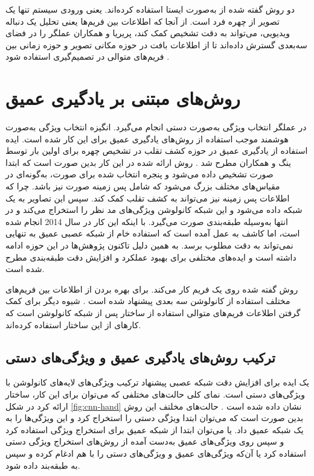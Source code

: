 دو روش گفته شده از  به‌صورت ایستا استفاده کرده‌اند. یعنی ورودی سیستم تنها یک تصویر از چهره فرد است. از آنجا که اطلاعات بین فریم‌ها یعنی تحلیل یک دنباله ویدیویی، می‌تواند به دقت تشخیص کمک کند، پریریا و همکاران عملگر  را در فضای سه‌بعدی گسترش داده‌اند تا از اطلاعات بافت در حوزه مکانی تصویر و حوزه زمانی بین فریم‌های متوالی در تصمیم‌گیری استفاده شود
\cite{freitas2012lbp}.
\section{روش‌های مبتنی بر یادگیری عمیق}
 در عملگر  انتخاب ویژگی به‌صورت دستی انجام می‌گیرد. انگیزه انتخاب ویژگی به‌صورت هوشمند موجب استفاده از روش‌های یادگیری عمیق برای این کار شده است. ایده استفاده از یادگیری عمیق در حوزه کشف تقلب در تشخیص چهره برای اولین بار توسط ینگ و همکاران مطرح شد 
\cite{yang2014learn}.
 روش ارائه شده در این کار بدین صورت است که ابتدا صورت تشخیص داده می‌شود و پنجره انتخاب شده برای صورت، به‌گونه‌ای در مقیاس‌های مختلف بزرگ می‌شود که شامل پس زمینه صورت نیز باشد. چرا که اطلاعات پس زمینه نیز می‌تواند به کشف تقلب کمک کند. سپس این تصاویر به یک شبکه 
\cite{krizhevsky2012imagenet}
  داده می‌شود و این شبکه کانولوشن ویژگی‌های مد نظر را استخراج می‌کند و در انتها به‌وسیله  طبقه‌بندی صورت می‌گیرد. با اینکه این کار در سال 2014 انجام شده است، اما کاشف به عمل آمده است که استفاده خام از شبکه عصبی عمیق به تنهایی نمی‌تواند به دقت مطلوب برسد. به همین دلیل تاکنون پژوهش‌ها در این حوزه ادامه داشته است و ایده‌های مختلفی برای بهبود عملکرد و افزایش دقت طبقه‌بندی مطرح شده است. 
 
 روش گفته شده روی یک فریم کار می‌کند. برای بهره بردن از اطلاعات بین فریم‌های مختلف استفاده از کانولوشن سه بعدی پیشنهاد شده است 
\cite{gan20173d,li2018learning}
 . شیوه دیگر برای کمک گرفتن اطلاعات فریم‌های متوالی استفاده از ساختار
 \cite{hochreiter1997long}
  پس از شبکه کانولوشن است که کارهای
\cite{xu2015learning,yang2019face}
از این ساختار استفاده کرده‌اند.
 

\subsection{ترکیب روش‌های یادگیری عمیق و ویژگی‌های دستی}
یک ایده برای افزایش دقت شبکه عصبی پیشنهاد ترکیب ویژگی‌های لایه‌های کانولوشن با ویژگی‌های دستی
 است. نمای کلی حالت‌های مختلفی که می‌توان برای این کار، ساختار ارائه کرد در شکل 
\ref{fig:cnn-hand}
نشان داده شده است 
\cite{yu2021deep}.
 حالت‌های مخلتف این روش بدین صورت است که می‌توان ابتدا ویژگی دستی را استخراج کرد و این ویژگی‌ها را به یک شبکه عمیق داد. یا می‌توان ابتدا از شبکه عمیق برای استخراج ویژگی استفاده کرد و سپس روی ویژگی‌های عمیق به‌دست آمده از روش‌های استخراج ویژگی دستی استفاده کرد یا آن‌که ویژگی‌های عمیق و ویژگی‌های دستی را با هم ادغام کرده و سپس به طبقه‌بند داده شود.

